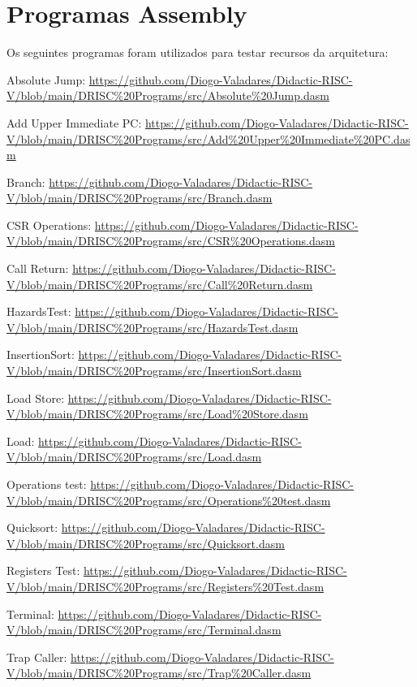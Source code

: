 \documentclass[
	12pt,				%
	openright,			%
	oneside,			%
	a4paper,			%
	english,			%
	french,				%
	spanish,			%
	brazil,				%
	]{abntex2}
\begin{document}
\chapter{Programas Assembly}\label{ap:programas_teste}

Os seguintes programas foram utilizados para testar recursos da arquitetura:

Absolute Jump: \url{https://github.com/Diogo-Valadares/Didactic-RISC-V/blob/main/DRISC%20Programs/src/Absolute%20Jump.dasm}

Add Upper Immediate PC: \url{https://github.com/Diogo-Valadares/Didactic-RISC-V/blob/main/DRISC%20Programs/src/Add%20Upper%20Immediate%20PC.dasm}

Branch: \url{https://github.com/Diogo-Valadares/Didactic-RISC-V/blob/main/DRISC%20Programs/src/Branch.dasm}

CSR Operations: \url{https://github.com/Diogo-Valadares/Didactic-RISC-V/blob/main/DRISC%20Programs/src/CSR%20Operations.dasm}

Call Return: \url{https://github.com/Diogo-Valadares/Didactic-RISC-V/blob/main/DRISC%20Programs/src/Call%20Return.dasm}

HazardsTest: \url{https://github.com/Diogo-Valadares/Didactic-RISC-V/blob/main/DRISC%20Programs/src/HazardsTest.dasm}

InsertionSort: \url{https://github.com/Diogo-Valadares/Didactic-RISC-V/blob/main/DRISC%20Programs/src/InsertionSort.dasm}

Load Store: \url{https://github.com/Diogo-Valadares/Didactic-RISC-V/blob/main/DRISC%20Programs/src/Load%20Store.dasm}

Load: \url{https://github.com/Diogo-Valadares/Didactic-RISC-V/blob/main/DRISC%20Programs/src/Load.dasm}

Operations test: \url{https://github.com/Diogo-Valadares/Didactic-RISC-V/blob/main/DRISC%20Programs/src/Operations%20test.dasm}

Quicksort: \url{https://github.com/Diogo-Valadares/Didactic-RISC-V/blob/main/DRISC%20Programs/src/Quicksort.dasm}

Registers Test: \url{https://github.com/Diogo-Valadares/Didactic-RISC-V/blob/main/DRISC%20Programs/src/Registers%20Test.dasm}

Terminal: \url{https://github.com/Diogo-Valadares/Didactic-RISC-V/blob/main/DRISC%20Programs/src/Terminal.dasm}

Trap Caller: \url{https://github.com/Diogo-Valadares/Didactic-RISC-V/blob/main/DRISC%20Programs/src/Trap%20Caller.dasm}
\end{document}
